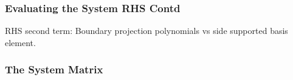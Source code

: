 \documentclass[compress]{beamer}
\begin{document}
\begin{frame}
  \frametitle{Evaluating the System RHS Contd}
   {}
           {}
  {\scriptsize RHS second term: Boundary projection polynomials vs side supported basis element.}
  \pause 
\end{frame}

\subsubsection{The System Matrix}
\end{document}
